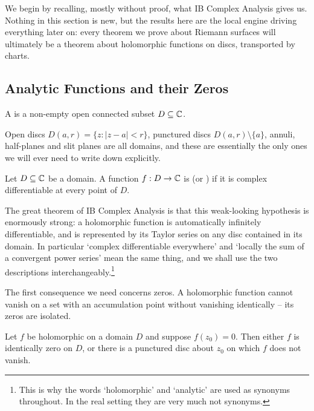 \documentclass[a4paper]{scrartcl}
\begin{document}
We begin by recalling, mostly without proof, what IB Complex Analysis gives us. Nothing
in this section is new, but the results here are the local engine driving everything
later on: every theorem we prove about Riemann surfaces will ultimately be a theorem
about holomorphic functions on discs, transported by charts.

\subsection{Analytic Functions and their Zeros}

\begin{definition}[Domain]
	A  is a non-empty open connected subset $D \subseteq \mathbb{C}$.
\end{definition}

Open discs $D(a, r) = \{z : |z - a| < r\}$, punctured discs $D(a,r) \setminus \{a\}$,
annuli, half-planes and slit planes are all domains, and these are essentially the only
ones we will ever need to write down explicitly.

\begin{definition}
	Let $D \subseteq \mathbb{C}$ be a domain. A function $f: D \to \mathbb{C}$ is 
	(or ) if it is complex differentiable at every point of $D$.
\end{definition}

The great theorem of IB Complex Analysis is that this weak-looking hypothesis is
enormously strong: a holomorphic function is automatically infinitely differentiable,
and is represented by its Taylor series on any disc contained in its domain. In
particular `complex differentiable everywhere' and `locally the sum of a convergent
power series' mean the same thing, and we shall use the two descriptions
interchangeably.\footnote{This is why the words `holomorphic' and `analytic' are used
as synonyms throughout. In the real setting they are very much not synonyms.}

The first consequence we need concerns zeros. A holomorphic function cannot vanish on a
set with an accumulation point without vanishing identically -- its zeros are isolated.

\begin{proposition}\label{prop:isolatedzeros}
	Let $f$ be holomorphic on a domain $D$ and suppose $f(z_0) = 0$. Then either $f$ is
	identically zero on $D$, or there is a punctured disc about $z_0$ on which $f$ does
	not vanish.
\end{proposition}
\end{document}
